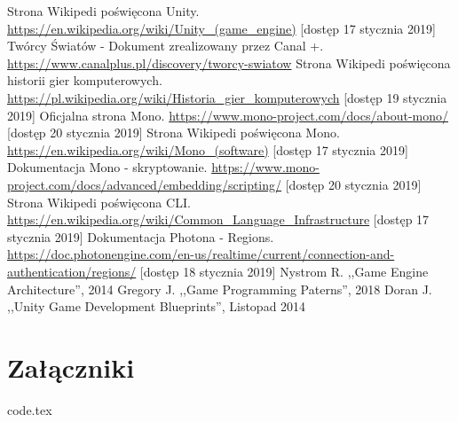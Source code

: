 \documentclass[a4paper,12pt,twoside,openany]{report}
\begin{document}
\begin{thebibliography}{99}
 {Strona Wikipedi poświęcona Unity.  \url{https://en.wikipedia.org/wiki/Unity_(game_engine)} [dostęp 17 stycznia 2019]}
 {Twórcy Światów - Dokument zrealizowany przez Canal +. \url{https://www.canalplus.pl/discovery/tworcy-swiatow}}
 {Strona Wikipedi poświęcona historii gier komputerowych. \url{https://pl.wikipedia.org/wiki/Historia_gier_komputerowych} [dostęp 19 stycznia 2019]}
 {Oficjalna strona Mono. \url{https://www.mono-project.com/docs/about-mono/} [dostęp 20 stycznia 2019]}
 {Strona Wikipedi poświęcona Mono. \url{https://en.wikipedia.org/wiki/Mono_(software)} [dostęp 17 stycznia 2019]}
 {Dokumentacja Mono - skryptowanie. \url{https://www.mono-project.com/docs/advanced/embedding/scripting/} [dostęp 20 stycznia 2019]}
 {Strona Wikipedi poświęcona CLI. \url{https://en.wikipedia.org/wiki/Common_Language_Infrastructure} [dostęp 17 stycznia 2019]}
 {Dokumentacja Photona - Regions. \url{https://doc.photonengine.com/en-us/realtime/current/connection-and-authentication/regions/} [dostęp 18 stycznia 2019]}
 {Nystrom R. ,,Game Engine Architecture'', 2014}
 {Gregory J. ,,Game Programming Paterns'', 2018}
 {Doran J. ,,Unity Game Development Blueprints'', Listopad 2014}

\end{thebibliography}

\listoffigures
 
\listoftables

\appendix
\chapter{Załączniki}
     {code.tex}

\end{document}
